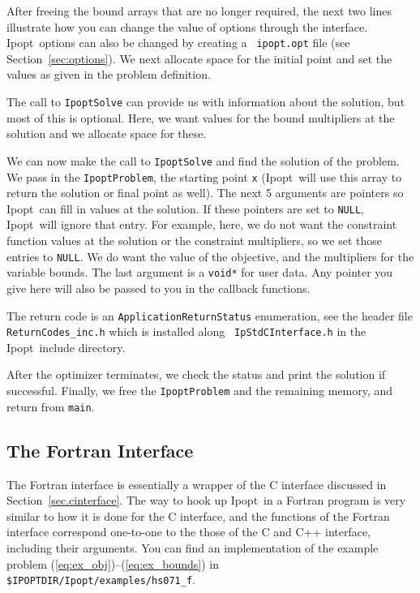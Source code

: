 \documentclass[10pt]{article}
\newcommand{\Ipopt}{{\sc Ipopt}}
\begin{document}
After freeing the bound arrays that are no longer required, the next
two lines illustrate how you can change the value of options through
the interface.  \Ipopt\ options can also be changed by creating a {\tt
ipopt.opt} file (see Section~\ref{sec:options}). We next allocate
space for the initial point and set the values as given in the problem
definition.

The call to {\tt IpoptSolve} can provide us with information about the
solution, but most of this is optional. Here, we want values for the
bound multipliers at the solution and we allocate space for these.

We can now make the call to {\tt IpoptSolve} and find the solution of
the problem. We pass in the {\tt IpoptProblem}, the starting point
{\tt x} (\Ipopt\ will use this array to return the solution or final
point as well).  The next 5 arguments are pointers so \Ipopt\ can fill
in values at the solution.  If these pointers are set to {\tt NULL},
\Ipopt\ will ignore that entry.  For example, here, we do not want the
constraint function values at the solution or the constraint
multipliers, so we set those entries to {\tt NULL}. We do want the
value of the objective, and the multipliers for the variable bounds.
The last argument is a {\tt void*} for user data. Any pointer you give
here will also be passed to you in the callback functions.

The return code is an {\tt ApplicationReturnStatus} enumeration, see
the header file {\tt ReturnCodes\_inc.h} which is installed along {\tt
  IpStdCInterface.h} in the \Ipopt\ include directory.

After the optimizer terminates, we check the status and print the
solution if successful. Finally, we free the {\tt IpoptProblem} and
the remaining memory, and return from {\tt main}.

\subsection{The Fortran Interface}

The Fortran interface is essentially a wrapper of the C interface
discussed in Section~\ref{sec.cinterface}.  The way to hook up \Ipopt\
in a Fortran program is very similar to how it is done for the C
interface, and the functions of the Fortran interface correspond
one-to-one to the those of the C and C++ interface, including their
arguments.  You can find an implementation of the example problem
(\ref{eq:ex_obj})--(\ref{eq:ex_bounds}) in {\tt
  \$IPOPTDIR/Ipopt/examples/hs071\_f}.
\end{document}
